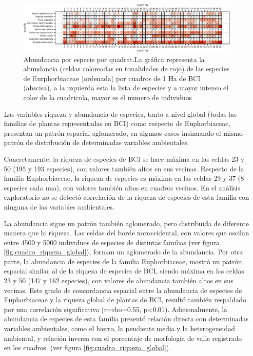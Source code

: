 \documentclass[11pt,]{article}
\begin{document}
\begin{figure}
\centering
\includegraphics{manuscrito_files/figure-latex/unnamed-chunk-3-1.pdf}
\caption{\label{fig:abun_sp_q}Abundancia por especie por quadrat.La
gráfica representa la abundancia (celdas coloreadas en tonalidades de
rojo) de las especies de Eurphorbiaceae (ordenada) por cuadros de 1 Ha
de BCI (abscisa), a la izquierda esta la lista de especies y a mayor
intenso el color de la cuadricula, mayor es el numero de individuos}
\end{figure}

Las variables riqueza y abundancia de especies, tanto a nivel global
(todas las familias de plantas representadas en BCI) como respecto de
Euphorbiaceae, presentan un patrón espacial aglomerado, en algunos casos
insinuando el mismo patrón de distribución de determinadas variables
ambientales.

Concretamente, la riqueza de especies de BCI se hace máxima en las
celdas 23 y 50 (195 y 193 especies), con valores también altos en sus
vecinas. Respecto de la familia Euphorbiaceae, la riqueza de especies es
máxima en las celdas 29 y 37 (8 especies cada una), con valores también
altos en cuadros vecinos. En el análisis exploratorio no se detectó
correlación de la riqueza de especies de esta familia con ninguna de las
variables ambientales.

La abundancia sigue un patrón también aglomerado, pero distribuida de
diferente manera que la riqueza. Las celdas del borde noroccidental, con
valores que oscilan entre 4500 y 5000 individuos de especies de
distintas familias (ver figura \ref{fig:cuadro_riqueza_global}), forman
un aglomerado de la abundancia. Por otra parte, la abundancia de
especies de la familia Euphorbiaceae, mostró un patrón espacial similar
al de la riqueza de especies de BCI, siendo máxima en las celdas 23 y 50
(147 y 162 especies), con valores de abundancia también altos en sus
vecinas. Este grado de concordancia espacial entre la abundancia de
especies de Euphorbiaceae y la riqueza global de plantas de BCI, resultó
también respaldado por una correlación significativa (r=rho=0.55,
p\textless{}0.01). Adicionalmente, la abundancia de especies de esta
familia presentó relación directa con determinadas variables
ambientales, como el hierro, la pendiente media y la heterogeneidad
ambiental, y relación inversa con el porcentaje de morfología de valle
registrado en los cuadros. (ver figura \ref{fig:cuadro_riqueza_global}).
\end{document}
